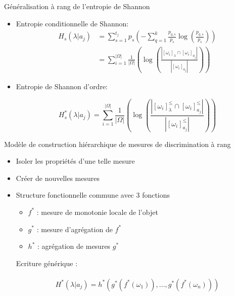 \documentclass[usenames,dvipsnames]{beamer}
\newcommand{\beamcite}[1]{\hfill {\footnotesize \textcite{#1}}}
\newcommand{\myfrac}[2]{\frac{\displaystyle {#1}}{\displaystyle {#2}}}
\begin{document}
\begin{frame}{Généralisation à rang de l'entropie de Shannon \beamcite{hu-information}}
\begin{itemize}
\item Entropie conditionnelle de Shannon: 
    \begin{align*}
        H_s\left(\lambda | a_j\right) &= \sum_{s=1}^{t_j}p_s\left(-\sum_{q=1}^{k}\myfrac{p_{q,s}}{p_s}\log\left(\myfrac{p_{q,s}}{p_s}\right)\right)\\
            &= \sum_{i=1}^{|\Omega|} \frac{1}{|\Omega|}\left(\log \left(\frac{|[\omega_i]_{\lambda} \cap [\omega_i]_{a_j}|}{|[\omega_i]_{a_j}|}\right)\right)
    \end{align*}
\item Entropie de Shannon d'ordre: 

    $$H^*_s\left(\lambda | a_j\right) = \sum_{i=1}^{|\Omega|} \frac{1}{|\Omega|}\left(\log \left(\frac{|[\omega_i]^{\leq}_{\lambda} \cap [\omega_i]^{\leq}_{a_j}|}{|[\omega_i]^{\leq}_{a_j}|}\right)\right)$$

\end{itemize}

\end{frame}

\begin{frame}{Modèle de construction hiérarchique de mesures de discrimination à rang \beamcite{marsala-rank}}
\begin{itemize}
\item Isoler les propriétés d'une telle mesure
\item Créer de nouvelles mesures
\item Structure fonctionnelle commune avec 3 fonctions \\
\begin{itemize}
\item $f^*$ : mesure de monotonie locale de l'objet
\item $g^*$ : mesure d'agrégation de $f^*$
\item $h^*$ : agrégation de mesures $g^*$
\end{itemize}
Ecriture générique : \\~\
            $$H^*(\lambda | a_j) = h^*(g^*(f^*(\omega_1)),...,g^*(f^*(\omega_n)))$$
\end{itemize}
\end{frame}
\end{document}
